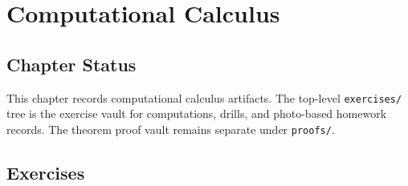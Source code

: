 \chapter{Computational Calculus}

\section*{Chapter Status}
This chapter records computational calculus artifacts. The top-level
\texttt{exercises/} tree is the exercise vault for computations, drills, and
photo-based homework records. The theorem proof vault remains separate under
\texttt{proofs/}.

\clearpage
\section*{Exercises}

\clearpage

